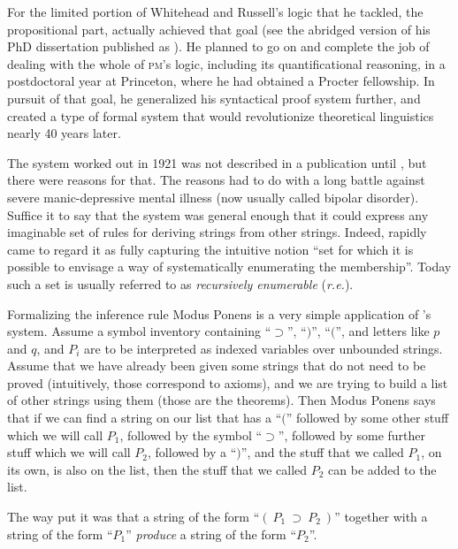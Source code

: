 \documentclass[output=paper]{langscibook}
\begin{document}
For the limited portion of  Whitehead and Russell's logic that he tackled, the propositional part, {\Post} actually achieved that goal (see the abridged version of his PhD dissertation published as \citealt{Post21}). He planned to go on and complete the job of dealing with the whole of \textsc{pm}'s logic, including its quantificational reasoning, in a postdoctoral year at Princeton, where he had obtained a Procter fellowship. In pursuit of that goal, he generalized his syntactical proof system further, and created a type of formal system that would revolutionize theoretical linguistics nearly 40 years later.

The system {\Post} worked out in 1921 was not described in a publication until \citeyear{Post43}, but there were reasons for that. The reasons had to do with a long battle against severe manic-depressive mental illness (now usually called bipolar disorder). Suffice it to say that the system was general enough that it could express any imaginable set of rules for deriving strings from other strings. Indeed, {\Post} rapidly came to regard it as fully capturing the intuitive notion ``set for which it is possible to envisage a way of systematically enumerating the membership''. Today such a set is usually referred to as \emph{recursively enumerable} (\emph{r.e.}).

Formalizing the inference rule Modus Ponens is a very simple application of {\Post}'s system. Assume a symbol inventory containing ``$\supset$'', ``$)$'', ``$($'', and letters like $p$ and $q$, and $P_i$ are to be interpreted as indexed variables over unbounded strings.  Assume that we have already been given some strings that do not need to be proved (intuitively, those correspond to axioms), and we are trying to build a list of other strings using them (those are the theorems).  Then Modus Ponens says that if we can find a string on our list that has a ``$($'' followed by some other stuff which we will call $P_1$, followed by the symbol ``$\supset$'', followed by some further stuff which we will call $P_2$, followed by a ``$)$'', and the stuff that we called $P_1$, on its own, is also on the list, then the stuff that we called $P_2$ can be added to the list.

The way {\Post} put it was that a string of the form ``$(\:P_1\:\supset\:P_2\:)$'' together with a string of the form ``$P_1$'' \emph{produce} a string of the form ``$P_2$''.
\end{document}
